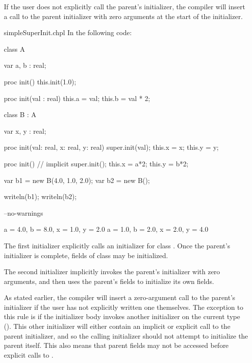 If the user does not explicitly call the parent's initializer, the compiler
will insert a call to the parent initializer with zero arguments at the start
of the initializer.

\begin{chapelexample}{simpleSuperInit.chpl}
In the following code:
\begin{chapel}
class A {
  var a, b : real;

  proc init() {
    this.init(1.0);
  }

  proc init(val : real) {
    this.a = val;
    this.b = val * 2;
  }
}

class B : A {
  var x, y : real;

  proc init(val: real, x: real, y: real) {
    super.init(val);
    this.x = x;
    this.y = y;
  }

  proc init() {
    // implicit super.init();
    this.x = a*2;
    this.y = b*2;
  }
}

var b1 = new B(4.0, 1.0, 2.0);
var b2 = new B();
\end{chapel}
\begin{chapelpost}
writeln(b1);
writeln(b2);
\end{chapelpost}
\begin{chapelcompopts}
--no-warnings
\end{chapelcompopts}
\begin{chapeloutput}
{a = 4.0, b = 8.0, x = 1.0, y = 2.0}
{a = 1.0, b = 2.0, x = 2.0, y = 4.0}
\end{chapeloutput}
The first initializer explicitly calls an initializer for class . Once
the parent's initializer is complete, fields of class  may be
initialized.

The second initializer implicitly invokes the parent's initializer with zero
arguments, and then uses the parent's fields to initialize its own fields.
\end{chapelexample}

As stated earlier, the compiler will insert a zero-argument call to the
parent's initializer if the user has not explicitly written one themselves.
The exception to this rule is if the initializer body invokes another
initializer on the current type (). This
other initializer will either contain an implicit or explicit call to the
parent initializer, and so the calling initializer should not attempt to
initialize the parent itself. This also means that parent fields may not be
accessed before explicit calls to .

